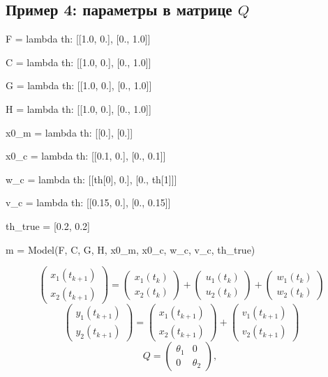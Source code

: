 \documentclass[a4paper,14pt]{extarticle}
\newcommand{\fut}[0]{t_{k+1}}
\begin{document}
\subsection{Пример 4: параметры в матрице $Q$}

\begin{pycode}[model4]
F = lambda th: [[1.0, 0.],
                [0., 1.0]]

C = lambda th: [[1.0, 0.],
                [0., 1.0]]

G = lambda th: [[1.0, 0.],
                [0., 1.0]]

H = lambda th: [[1.0, 0.],
                [0., 1.0]]

x0_m = lambda th: [[0.],
                   [0.]]

x0_c = lambda th: [[0.1, 0.],
                   [0., 0.1]]

w_c = lambda th: [[th[0], 0.],
                  [0., th[1]]]

v_c = lambda th: [[0.15, 0.],
                  [0., 0.15]]

th_true = [0.2, 0.2]

m = Model(F, C, G, H, x0_m, x0_c, w_c, v_c, th_true)
\end{pycode}

\[
  \begin{pmatrix} x_1(\fut) \\ x_2(\fut) \end{pmatrix} =
  \begin{pmatrix} x_1(t_k) \\ x_2(t_k) \end{pmatrix} +
  \begin{pmatrix} u_1(t_k) \\ u_2(t_k) \end{pmatrix}
  + \begin{pmatrix} w_1(t_k) \\ w_2(t_k) \end{pmatrix}
\]
\[
  \begin{pmatrix} y_1(\fut) \\ y_2(\fut) \end{pmatrix} =
  \begin{pmatrix} x_1(\fut) \\ x_2(\fut) \end{pmatrix} +
  \begin{pmatrix} v_1(\fut) \\ v_2(\fut) \end{pmatrix}
\]
\[
  Q = \begin{pmatrix} \theta_1 & 0 \\ 0 & \theta_2 \end{pmatrix},\
\]
\end{document}
